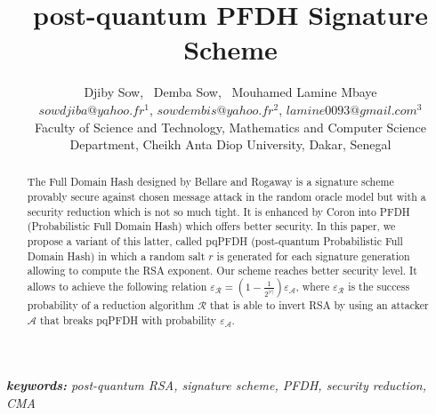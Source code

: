 \documentclass[a4paper,11pt]{article}
\author{Djiby Sow, \ Demba Sow, \ Mouhamed Lamine Mbaye\\
\small{$sowdjiba@yahoo.fr^1$,  $sowdembis@yahoo.fr^2$,  $lamine0093@gmail.com^3$}\\
Faculty of Science and Technology, Mathematics and Computer Science Department, Cheikh Anta Diop University, Dakar, Senegal}
\begin{document}
\title{post-quantum PFDH Signature Scheme}
\maketitle
\begin{abstract}
The Full Domain Hash designed by Bellare and Rogaway is a signature scheme provably secure against chosen message attack in the random oracle model but with a security reduction which is not so much tight. It is enhanced by Coron into PFDH (Probabilistic Full Domain Hash) which offers better security. In this paper, we propose a variant of this latter, called pqPFDH (post-quantum Probabilistic Full Domain Hash) in which a random salt $r$ is generated for each signature generation  allowing to compute the RSA exponent. Our scheme reaches  better security level. It allows to achieve the following relation $\varepsilon_\mathcal{R}=(1-\frac{1}{2^{|r|}})\varepsilon_\mathcal{A}$, where $\varepsilon_{\mathcal{R}}$  is the success probability of a reduction algorithm $\mathcal{R}$ that is able to invert RSA by using an attacker $\mathcal{A}$ that breaks pqPFDH with probability $\varepsilon_{\mathcal{A}}$.
\end{abstract}
{\it \textbf{keywords:} post-quantum RSA, signature scheme, PFDH, security reduction, CMA}
\end{document}
